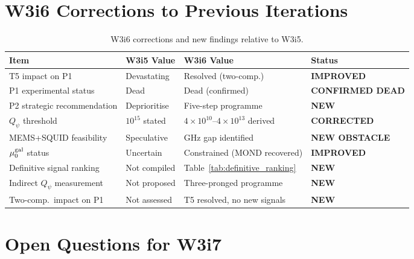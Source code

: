 \documentclass[11pt]{article}
\newcommand{\ee}[1]{\times 10^{#1}}
\newcommand{\Qpsi}{Q_\psi}
\newcommand{\muG}{\mu_0^{\rm gal}}
\theoremstyle{definition}
\theoremstyle{remark}
\begin{document}
\section{W3i6 Corrections to Previous Iterations}
\label{sec:corrections}

\begin{table}[H]
\centering
\caption{W3i6 corrections and new findings relative to W3i5.}
\label{tab:corrections}
\renewcommand{\arraystretch}{1.2}
\begin{tabular}{@{}p{4.5cm}p{3cm}p{3cm}l@{}}
\toprule
\textbf{Item} & \textbf{W3i5 Value} & \textbf{W3i6 Value} & \textbf{Status} \\
\midrule
T5 impact on P1 & Devastating & Resolved (two-comp.) &
  \textcolor{strongcolor}{\textbf{IMPROVED}} \\
P1 experimental status & Dead & Dead (confirmed) &
  \textcolor{falsified}{\textbf{CONFIRMED DEAD}} \\
P2 strategic recommendation & Deprioritise & Five-step programme &
  \textcolor{strongcolor}{\textbf{NEW}} \\
$\Qpsi$ threshold & $10^{15}$ stated & $4\ee{10}$--$4\ee{13}$ derived &
  \textcolor{strongcolor}{\textbf{CORRECTED}} \\
MEMS+SQUID feasibility & Speculative & GHz gap identified &
  \textcolor{conjcolor}{\textbf{NEW OBSTACLE}} \\
$\muG$ status & Uncertain & Constrained (MOND recovered) &
  \textcolor{strongcolor}{\textbf{IMPROVED}} \\
Definitive signal ranking & Not compiled & Table~\ref{tab:definitive_ranking} &
  \textcolor{strongcolor}{\textbf{NEW}} \\
Indirect $\Qpsi$ measurement & Not proposed & Three-pronged programme &
  \textcolor{strongcolor}{\textbf{NEW}} \\
Two-comp.\ impact on P1 & Not assessed & T5 resolved, no new signals &
  \textcolor{strongcolor}{\textbf{NEW}} \\
\bottomrule
\end{tabular}
\end{table}

\section{Open Questions for W3i7}
\label{sec:open_questions}
\end{document}
